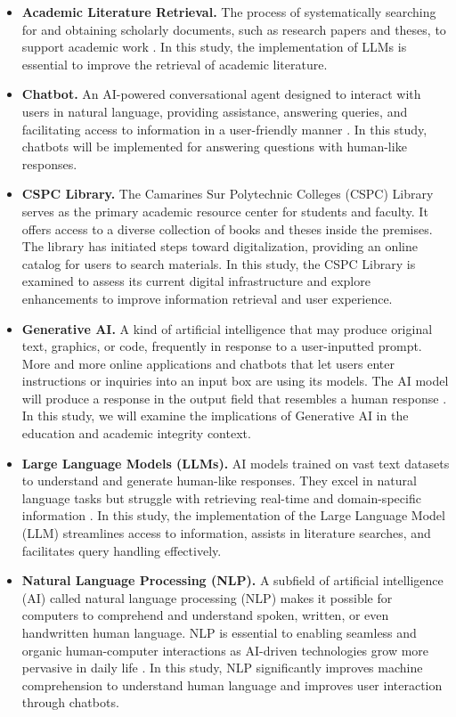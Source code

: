 \begin{refsection}
\begin{itemize}
    \item \textbf{Academic Literature Retrieval.} The process of systematically searching for and obtaining scholarly documents, such as research papers and theses, to support academic work \cite{sallam2023chatgpt}. In this study, the implementation of LLMs is essential to improve the retrieval of academic literature.
    \item \textbf{Chatbot.} An AI-powered conversational agent designed to interact with users in natural language, providing assistance, answering queries, and facilitating access to information in a user-friendly manner \cite{chow2023developing}. In this study, chatbots will be implemented for answering questions with human-like responses.
    \item \textbf{CSPC Library.} The Camarines Sur Polytechnic Colleges (CSPC) Library serves as the primary academic resource center for students and faculty. It offers access to a diverse collection of books and theses inside the premises. The library has initiated steps toward digitalization, providing an online catalog for users to search materials. In this study, the CSPC Library is examined to assess its current digital infrastructure and explore enhancements to improve information retrieval and user experience.
    \item \textbf{Generative AI.} A kind of artificial intelligence that may produce original text, graphics, or code, frequently in response to a user-inputted prompt. More and more online applications and chatbots that let users enter instructions or inquiries into an input box are using its models. The AI model will produce a response in the output field that resembles a human response \cite{bozkurt2024genai}. In this study, we will examine the implications of Generative AI in the education and academic integrity context.
    \item \textbf{Large Language Models (LLMs).} AI models trained on vast text datasets to understand and generate human-like responses. They excel in natural language tasks but struggle with retrieving real-time and domain-specific information \cite{klang2024advancing}. In this study, the implementation of the Large Language Model (LLM) streamlines access to information, assists in literature searches, and facilitates query handling effectively.
    \item \textbf{Natural Language Processing (NLP).} A subfield of artificial intelligence (AI) called natural language processing (NLP) makes it possible for computers to comprehend and understand spoken, written, or even handwritten human language. NLP is essential to enabling seamless and organic human-computer interactions as AI-driven technologies grow more pervasive in daily life \cite{ramirez2024natural}. In this study, NLP significantly improves machine comprehension to understand human language and improves user interaction through chatbots.

\end{itemize}
\end{refsection}
